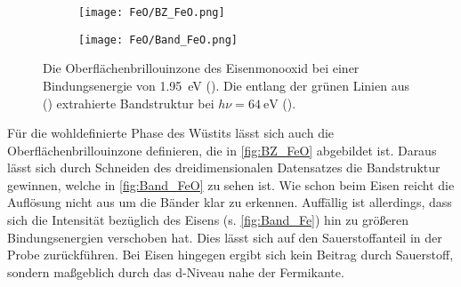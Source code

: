         \begin{figure}
            \begin{subfigure}[t]{0.34\textwidth}
                \centering
                \texttt{[image: FeO/BZ\_FeO.png]}
                \subcaption{}
                \label{fig:BZ_FeO}
            \end{subfigure}
            \begin{subfigure}[t]{0.62\textwidth}
                \centering
                \texttt{[image: FeO/Band\_FeO.png]}
                \subcaption{}
                \label{fig:Band_FeO}
            \end{subfigure}
            \caption{Die Oberflächenbrillouinzone des Eisenmonooxid bei einer Bindungsenergie von \SI{1.95}{\electronvolt} ().
            Die entlang der grünen Linien aus () extrahierte Bandstruktur bei $h\nu = \SI{64}{\electronvolt}$ ().}
        \end{figure}
        Für die wohldefinierte Phase des Wüstits lässt sich auch die Oberflächenbrillouinzone definieren, die in \autoref{fig:BZ_FeO} abgebildet ist.
        Daraus lässt sich durch Schneiden des dreidimensionalen Datensatzes die Bandstruktur gewinnen, welche in \autoref{fig:Band_FeO} zu sehen ist.
        Wie schon beim Eisen reicht die Auflösung nicht aus um die Bänder klar zu erkennen.
        Auffällig ist allerdings, dass sich die Intensität bezüglich des Eisens (s. \autoref{fig:Band_Fe}) hin zu größeren Bindungsenergien verschoben hat.
        Dies lässt sich auf den Sauerstoffanteil in der Probe zurückführen. 
        Bei Eisen hingegen ergibt sich kein Beitrag durch Sauerstoff, sondern maßgeblich durch das d-Niveau nahe der Fermikante.

